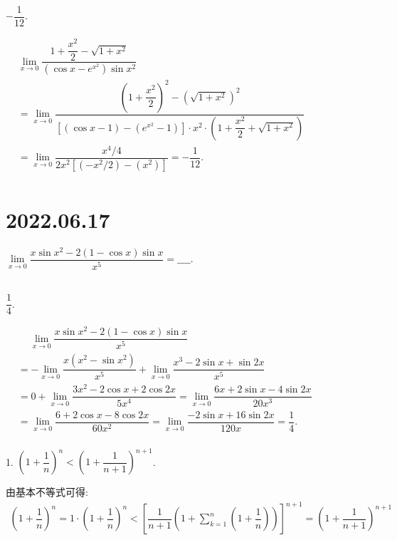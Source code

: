 \documentclass[lang=cn,12pt]{elegantbook}
\begin{document}
\begin{solution}
  $-\dfrac{1}{12}.$

  $\begin{aligned}
  & \lim\limits_{x \to 0} \dfrac{1+\dfrac{x^2}{2} - \sqrt{1+x^2}}{(\cos x - e^{x^2})\sin x^2} \\
  &= \lim\limits_{x\to 0} \dfrac{\left(1+\dfrac{x^2}{2}\right)^2-\left(\sqrt{1+x^2}\right)^2}{
    \left[(\cos x - 1) -\left(e^{x^2} - 1\right)\right] \cdot x^2 
    \cdot \left(1+\dfrac{x^2}{2}+\sqrt{1+x^2}\right)
  }\\
  &= \lim\limits_{x\to 0} \dfrac{x^4/4}{
    2x^2 \left[\left(-x^2/2\right) -\left(x^2\right)\right]
  } = -\dfrac{1}{12}.\\
  \end{aligned}
  $
\end{solution}
\section*{2022.06.17}

$\lim\limits_{x \to 0} \dfrac{
  x\sin x^2 - 2(1-\cos x)\sin x}{x^5} = \_\_\_\_.$
\\ \\

\begin{solution}
  $\dfrac{1}{4}.$

  $\begin{aligned}
  &\quad\  \lim\limits_{x \to 0} \dfrac{
    x\sin x^2 - 2(1-\cos x)\sin x}{x^5} \\
  &= -\lim\limits_{x \to 0} \dfrac{
    x(x^2-\sin x^2)}{x^5} + 
    \lim\limits_{x \to 0} \dfrac{
    x^3-2\sin x + \sin 2x}{x^5} \\
  &= 0 + 
  \lim\limits_{x \to 0} \dfrac{
  3x^2-2\cos x + 2\cos 2x}{5x^4} 
  = 
  \lim\limits_{x \to 0} \dfrac{
  6x + 2\sin x - 4\sin 2x}{20x^3} \\
  &= 
  \lim\limits_{x \to 0} \dfrac{
  6 + 2\cos x - 8\cos 2x}{60x^2}
  = \lim\limits_{x \to 0} \dfrac{
  -2\sin x + 16\sin 2x}{120x}
  = \dfrac{1}{4}.\\
  \end{aligned}
  $
\end{solution}

\newpage



1. $\left(1+\dfrac{1}{n}\right)^n < \left(1 + \dfrac{1}{n+1}\right)^{n+1}$.
\newline

\begin{solution}
  由基本不等式可得:
  $$\begin{aligned}
  \left(1+\dfrac{1}{n}\right)^n = 1 \cdot \left(1+\dfrac{1}{n}\right)^n
  < \left[\dfrac{1}{n+1}\left(1+\sum_{k=1}^{n}\left(1 + \dfrac{1}{n}\right)\right)\right]^{n+1}
  = \left(1+\dfrac{1}{n+1}\right)^{n+1}
  \end{aligned}$$
\end{solution}
\end{document}
